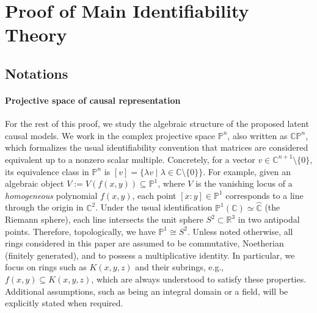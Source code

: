 \documentclass[10pt]{article}
\numberwithin{figure}{section}
\begin{document}
\section{Proof of Main Identifiability Theory}\label{Appendix_proof}
\subsection{Notations}\label{geometrynotation}

\paragraph{Projective space of causal representation} 
For the rest of this proof, we study the algebraic structure of the proposed latent causal models. We work in the complex projective space $\mathbb{P}^n$, also written as $\mathbb{CP}^{n}$, which formalizes the usual identifiability convention that matrices are considered equivalent up to a nonzero scalar multiple. Concretely, for a vector $v \in \mathbb{C}^{n+1}\setminus \{0\}$, its equivalence class in $\mathbb{P}^n$ is $[v] = \{\lambda v \mid \lambda \in \mathbb{C}\setminus \{0\}\}$. For example, given an algebraic object $V := V(f(x,y)) \subseteq \mathbb{P}^1$, where $V$ is the vanishing locus of a \emph{homogeneous} polynomial $f(x,y)$, each point $[x:y] \in \mathbb{P}^1$ corresponds to a line through the origin in $\mathbb{C}^2$.  Under the usual identification $\mathbb{P}^1(\mathbb{C}) \simeq \hat{\mathbb{C}}$ (the Riemann sphere), each line intersects the unit sphere $S^2 \subset \mathbb{R}^3$ in two antipodal points.  Therefore, topologically, we have $\mathbb{P}^1 \cong S^2$. Unless noted otherwise, all rings considered in this paper are assumed to be commutative, Noetherian (finitely generated), and to possess a multiplicative identity. In particular, we focus on rings such as $K(x,y,z)$ and their subrings, e.g., $f(x,y) \subseteq K(x,y,z)$, which are always understood to satisfy these properties. Additional assumptions, such as being an integral domain or a field, will be explicitly stated when required.
\end{document}
